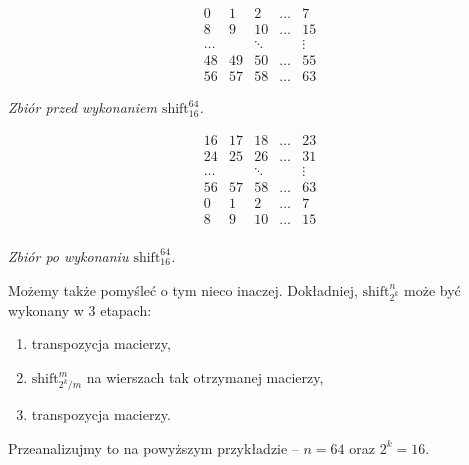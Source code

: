 \documentclass[a4paper]{article}
\newcommand{\shift}[2]{\text{shift}_{#2}^{#1}}
\theoremstyle{definition}
\begin{document}
\vspace{0.5em}

\begin{minipage}{.5\textwidth} %

\[
\begin{matrix}
 0 &  1 &  2 &  \ldots & 7 \\
 8 &  9 & 10 &  \ldots & 15 \\
\ldots & & \ddots &  & \vdots \\
48 & 49 & 50 & \ldots & 55 \\
56 & 57 & 58 & \ldots & 63 
\end{matrix}
\]

\begin{center} \it
    Zbiór przed wykonaniem \(\shift {64} {16}\).
\end{center}

\end{minipage} %
\begin{minipage}{.5\textwidth} %

\[
\begin{matrix}
16 & 17 & 18 & \ldots & 23 \\
24 & 25 & 26 & \ldots & 31 \\
\ldots & & \ddots &  & \vdots \\
56 & 57 & 58 & \ldots & 63 \\
0 &  1 &  2 &  \ldots & 7 \\
8 &  9 & 10 &  \ldots & 15 \\
\end{matrix}
\]

\begin{center} \it
    Zbiór po wykonaniu \(\shift {64} {16}\).
\end{center}
\end{minipage}

\vspace{1em}

Możemy także pomyśleć o tym nieco inaczej. Dokładniej, \(\shift n {2^k}\) może być wykonany w 3 etapach:

\begin{enumerate}
    \item transpozycja macierzy,
    \item \(\shift {m} {2^k/m}\) na wierszach tak otrzymanej macierzy,
    \item transpozycja macierzy.
\end{enumerate}

Przeanalizujmy to na powyższym przykładzie -- \(n = 64\) oraz \(2^k = 16\).
\end{document}
